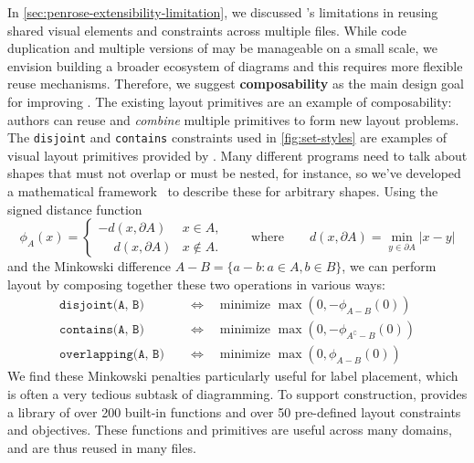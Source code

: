 In \cref{sec:penrose-extensibility-limitation}, we discussed \Penrose's limitations in reusing shared visual elements and constraints across multiple \Style files. While code duplication and multiple versions of \Style{} may be manageable on a small scale, we envision building a broader ecosystem of diagrams and this requires more flexible reuse mechanisms. Therefore, we suggest \textbf{composability} as the main design goal for improving \Penrose{}. The existing layout primitives are an example of composability: authors can reuse and \emph{combine} multiple primitives to form new layout problems. The \texttt{disjoint} and \texttt{contains} constraints used in \cref{fig:set-styles} are examples of visual layout primitives provided by \Penrose. Many different \Style{} programs need to talk about shapes that must not overlap or must be nested, for instance, so we've developed a mathematical framework~\cite{Minarcik2024Minkowski} to describe these for arbitrary shapes. Using the signed distance function
\setlength{\abovedisplayskip}{5pt} 
\setlength{\belowdisplayskip}{5pt} 
\setlength{\abovedisplayshortskip}{5pt} 
\setlength{\belowdisplayshortskip}{5pt}
\[
    \phi_A(x) = \begin{cases}
        -d(x, \partial A) & x \in A, \\
        \phantom{-}d(x, \partial A) & x \notin A.
    \end{cases}
    \qquad\text{where}\qquad
    d(x, \partial A) = \min_{y \in \partial A} |x-y|
\]
and the Minkowski difference $A - B = \{ a - b \colon a \in A, b \in B \}$, we can perform layout by composing together these two operations in various ways:
\begin{align*}
    \texttt{disjoint(A, B)} &\quad\iff\quad \text{minimize }\max(0, -\phi_{A - B}(0)) \\
    \texttt{contains(A, B)} &\quad\iff\quad \text{minimize }\max(0, -\phi_{A^\complement - B}(0)) \\
    \texttt{overlapping(A, B)} &\quad\iff\quad \text{minimize }\max(0, \phi_{A - B}(0))
\end{align*}
We find these Minkowski penalties particularly useful for label placement, which is often a very tedious subtask of diagramming.
To support \Style{} construction, \Penrose{} provides a library of over 200 built-in functions and over 50 pre-defined layout constraints and objectives. These functions and primitives are useful across many domains, and are thus reused in many \Style{} files.

